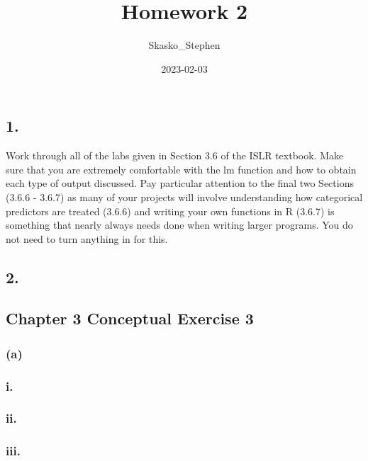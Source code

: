 \documentclass[
]{article}
\title{Homework 2}
\author{Skasko\_Stephen}
\date{2023-02-03}
\begin{document}
\maketitle

\hypertarget{section}{%
\subsection{1.}\label{section}}

Work through all of the labs given in Section 3.6 of the ISLR textbook.
Make sure that you are extremely comfortable with the lm function and
how to obtain each type of output discussed. Pay particular attention to
the final two Sections (3.6.6 - 3.6.7) as many of your projects will
involve understanding how categorical predictors are treated (3.6.6) and
writing your own functions in R (3.6.7) is something that nearly always
needs done when writing larger programs. You do not need to turn
anything in for this.

\hypertarget{section-1}{%
\subsection{2.}\label{section-1}}

\hypertarget{chapter-3-conceptual-exercise-3}{%
\subsection{Chapter 3 Conceptual Exercise
3}\label{chapter-3-conceptual-exercise-3}}

\hypertarget{a}{%
\subsubsection{(a)}\label{a}}

\hypertarget{i.}{%
\subsubsection{i.}\label{i.}}

\hypertarget{ii.}{%
\subsubsection{ii.}\label{ii.}}

\hypertarget{iii.}{%
\subsubsection{iii.}\label{iii.}}
\end{document}
